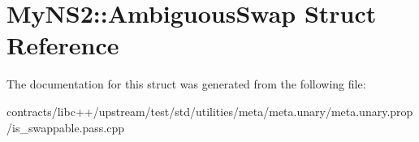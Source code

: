 \hypertarget{struct_my_n_s2_1_1_ambiguous_swap}{}\section{My\+N\+S2\+:\+:Ambiguous\+Swap Struct Reference}
\label{struct_my_n_s2_1_1_ambiguous_swap}


The documentation for this struct was generated from the following file\+:\begin{DoxyCompactItemize}
\item 
contracts/libc++/upstream/test/std/utilities/meta/meta.\+unary/meta.\+unary.\+prop/is\+\_\+swappable.\+pass.\+cpp\end{DoxyCompactItemize}
